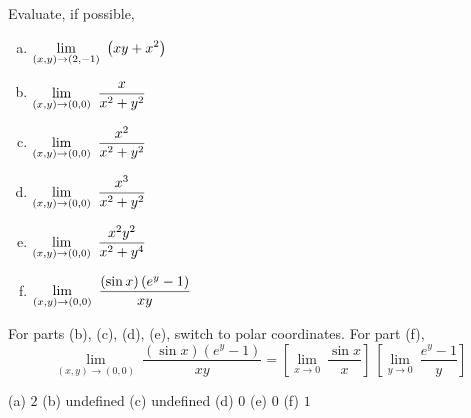 \subsection*{\Procedural}

\begin{question}
Evaluate, if possible,
\begin{enumerate}[(a)]
\item $\dst\lim_{(x,y)\rightarrow(2,-1)}\ \big(xy+x^2\big)$
\item $\dst\lim_{(x,y)\rightarrow(0,0)}\ \frac{x}{x^2+y^2}$
\item $\dst\lim_{(x,y)\rightarrow(0,0)}\ \frac{x^2}{x^2+y^2}$
\item $\dst\lim_{(x,y)\rightarrow(0,0)}\ \frac{x^3}{x^2+y^2}$
\item $\dst\lim_{(x,y)\rightarrow(0,0)}\ \frac{x^2y^2}{x^2+y^4}$
\item $\dst\lim_{(x,y)\rightarrow (0,0)}\ 
                        \frac{(\sin x)\left(e^y-1\right)}{xy}$
\end{enumerate}
\end{question}

\begin{hint}
For parts (b), (c), (d), (e), switch to polar coordinates.
For part (f),
\begin{equation*} 
\lim_{(x,y)\rightarrow (0,0)}\ 
                        \frac{(\sin x)\left(e^y-1\right)}{xy}
=\left[\lim_{x\rightarrow 0}\ 
                        \frac{\sin x}{x}\right]\ 
 \left[\lim_{y\rightarrow 0}\ 
                        \frac{e^y-1}{y}\right]
\end{equation*}
\end{hint}

\begin{answer}
(a) $2$ \qquad
(b) undefined\qquad
(c) undefined\qquad
(d) $0$\qquad
(e) $0$ \qquad
(f) $1$
\end{answer}

